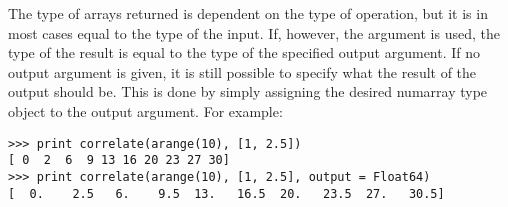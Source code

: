 The type of arrays returned is dependent on the type of operation, but it is  in most cases equal to the type of the input. If, however, the  argument is used, the type of the result is equal to the type of the specified output argument. If no output argument is given, it is still possible to specify what the result of the output should be. This is done by simply assigning the desired numarray type object to the output argument. For example:
\begin{verbatim}
>>> print correlate(arange(10), [1, 2.5])
[ 0  2  6  9 13 16 20 23 27 30]
>>> print correlate(arange(10), [1, 2.5], output = Float64)
[  0.    2.5   6.    9.5  13.   16.5  20.   23.5  27.   30.5]                   
\end{verbatim}
%
